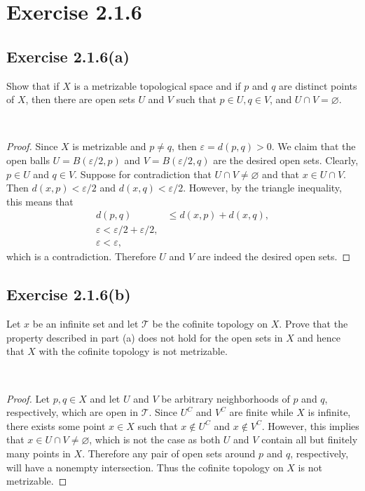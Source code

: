 \documentclass[12pt]{article}
\newenvironment{problem}
    {\begin{lrbox}{\mybox}\begin{minipage}{\textwidth-10pt}}
    {\end{minipage}\end{lrbox}\framebox[6.5in]{\usebox{\mybox}}\\}
\let\eps\varepsilon
\let\emptyset\varnothing
\newcommand{\T}{\mathscr{T}}
\begin{document}
\section*{Exercise 2.1.6}

\subsection*{Exercise 2.1.6(a)}
\begin{problem}
    Show that if $X$ is a metrizable topological  space and if $p$ and $q$ are distinct points of $X$, then there are open sets $U$ and $V$ such that $p\in U, q\in V$, and $U\cap V = \emptyset$.
\end{problem}

\begin{proof}
    Since $X$ is metrizable and $p\ne q$, then $\eps=d(p,q)>0$. We claim that the open balls $U=B(\eps/2, p)$ and $V=B(\eps/2, q)$ are the desired open sets. Clearly, $p\in U$ and $q\in V$. Suppose for contradiction that $U\cap V \ne \emptyset$ and that $x\in U\cap V$. Then $d(x,p)<\eps/2$ and $d(x,q)<\eps/2$. However, by the triangle inequality, this means that
    \begin{align*}
        d(p,q) &\leq d(x,p) + d(x,q), \\
        \eps < \eps/2 + \eps/2, \\
        \eps < \eps,
    \end{align*}
    which is a contradiction. Therefore $U$ and $V$ are indeed the desired open sets.
\end{proof}

\subsection*{Exercise 2.1.6(b)}
\begin{problem}
    Let $x$ be an infinite set and let $\T$ be the cofinite topology on $X$. Prove that the property described in part (a) does not hold for the open sets in $X$ and hence that $X$ with the cofinite topology is not metrizable.
\end{problem}

\begin{proof}
    Let $p,q\in X$ and let $U$ and $V$ be arbitrary neighborhoods of $p$ and $q$, respectively, which are open in $\T$. Since $U^C$ and $V^C$ are finite while $X$ is infinite, there exists some point $x\in X$ such that $x\notin U^C$ and $x\notin V^C$. However, this implies that $x\in U\cap V \ne \emptyset$, which is not the case as both $U$ and $V$ contain all but finitely many points in $X$. Therefore any pair of open sets around $p$ and $q$, respectively, will have a nonempty intersection. Thus the cofinite topology on $X$ is not metrizable.
    
\end{proof}
\end{document}
